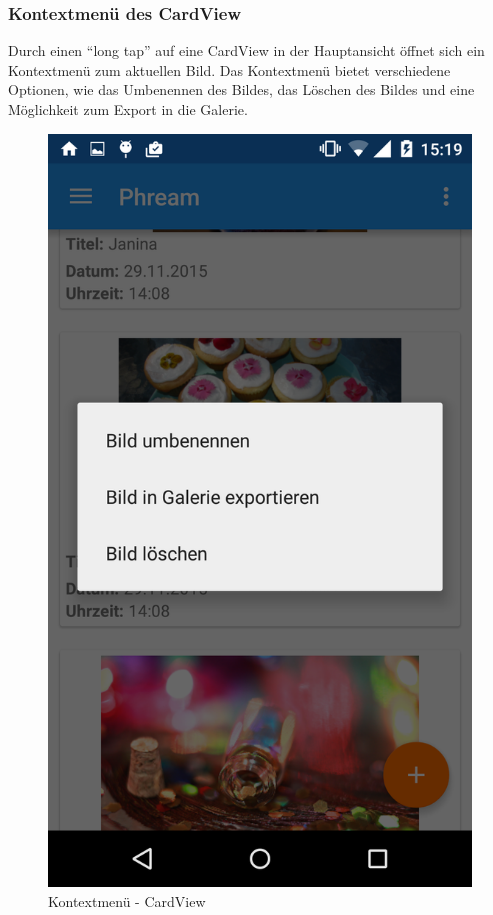 \subsubsection{Kontextmenü des CardView}

Durch einen \enquote{long tap} auf eine CardView in der Hauptansicht öffnet sich ein Kontextmenü zum aktuellen Bild. Das Kontextmenü bietet verschiedene Optionen, wie das Umbenennen des Bildes, das Löschen des Bildes und eine Möglichkeit zum Export in die Galerie. 

\begin{figure}[H]
	\centering
   \includegraphics[scale= 0.115]{images/screenshots/contextmenu.png}
  \caption{Kontextmenü - CardView}
\end{figure}

